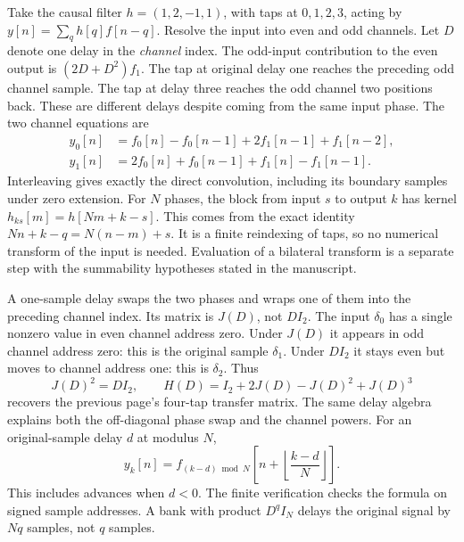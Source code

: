 Take the causal filter $h=(1,2,-1,1)$, with taps at $0,1,2,3$, acting by $y[n]=\sum_qh[q]f[n-q]$. Resolve the input into even and odd channels. Let $D$ denote one delay in the \emph{channel} index.
The odd-input contribution to the even output is $(2D+D^2)f_1$. The tap at original delay one reaches the preceding odd channel sample. The tap at delay three reaches the odd channel two positions back. These are different delays despite coming from the same input phase.
The two channel equations are
\[
\begin{aligned}
y_0[n]&=f_0[n]-f_0[n-1]+2f_1[n-1]+f_1[n-2],\\
y_1[n]&=2f_0[n]+f_0[n-1]+f_1[n]-f_1[n-1].
\end{aligned}
\]
Interleaving gives exactly the direct convolution, including its boundary samples under zero extension.
For $N$ phases, the block from input $s$ to output $k$ has kernel
$h_{ks}[m]=h[Nm+k-s]$. This comes from the exact identity
$Nn+k-q=N(n-m)+s$. It is a finite reindexing of taps, so no numerical transform of the input is needed. Evaluation of a bilateral transform is a separate step with the summability hypotheses stated in the manuscript.

A one-sample delay swaps the two phases and wraps one of them into the preceding channel index. Its matrix is $J(D)$, not $DI_2$.
The input $\delta_0$ has a single nonzero value in even channel address zero. Under $J(D)$ it appears in odd channel address zero: this is the original sample $\delta_1$. Under $DI_2$ it stays even but moves to channel address one: this is $\delta_2$.
Thus
\[
J(D)^2=DI_2,
\qquad
H(D)=I_2+2J(D)-J(D)^2+J(D)^3
\]
recovers the previous page's four-tap transfer matrix. The same delay algebra explains both the off-diagonal phase swap and the channel powers.
For an original-sample delay $d$ at modulus $N$,
\[
y_k[n]=f_{(k-d)\bmod N}
\!\left[n+\left\lfloor\frac{k-d}{N}\right\rfloor\right].
\]
This includes advances when $d<0$. The finite verification checks the formula on signed sample addresses. A bank with product $D^qI_N$ delays the original signal by $Nq$ samples, not $q$ samples.

